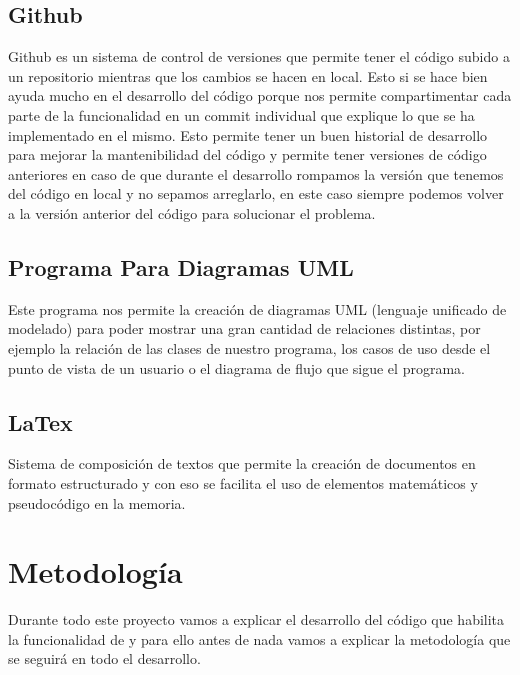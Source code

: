 \documentclass[12pt,a4paper]{article}
\begin{document}
\subsection{Github}
Github es un sistema de control de versiones que permite tener el código subido a un repositorio mientras que los cambios se hacen en local. Esto si se hace bien ayuda mucho en el desarrollo del código porque nos permite compartimentar cada parte de la funcionalidad en un commit individual que explique lo que se ha implementado en el mismo. Esto permite tener un buen historial de desarrollo para mejorar la mantenibilidad del código y permite tener versiones de código anteriores en caso de que durante el desarrollo rompamos la versión que tenemos del código en local y no sepamos arreglarlo, en este caso siempre podemos volver a la versión anterior del código para solucionar el problema.\\
\subsection{Programa Para Diagramas UML}
Este programa nos permite la creación de diagramas UML (lenguaje unificado de modelado) para poder mostrar una gran cantidad de relaciones distintas, por ejemplo la relación de las clases de nuestro programa, los casos de uso desde el punto de vista de un usuario o el diagrama de flujo que sigue el programa.\\
\subsection{LaTex}
Sistema de composición de textos que permite  la creación de documentos en formato estructurado y con eso se facilita el uso de elementos matemáticos y pseudocódigo en la memoria.\\
\pagebreak

	\section{Metodología}
	Durante todo este proyecto vamos a explicar el desarrollo del código que habilita la funcionalidad de \cite{Princial} y para ello antes de nada vamos a explicar la metodología que se seguirá en todo el desarrollo.\\
\end{document}
